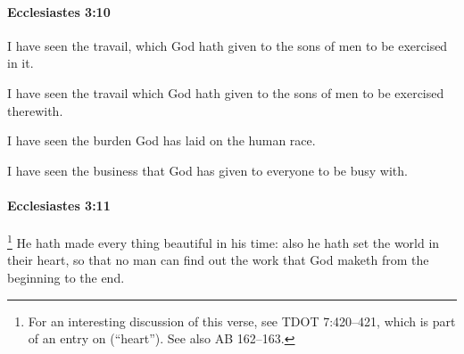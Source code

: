 		\paragraph{Ecclesiastes 3:10} %
			\label{ECCLESIASTES-3-10}

			I have seen the travail, which God hath given to the sons of men to be exercised in it.

			\begin{versebox}
					\item[BHS] 
					\item[LXX] 
					\item[ASV] I have seen the travail which God hath given to the sons of men to be exercised therewith.
					\item[NIV] I have seen the burden God has laid on the human race.
					\item[NRSV] I have seen the business that God has given to everyone to be busy with.
			\end{versebox}

		\paragraph{Ecclesiastes 3:11} %
			\label{ECCLESIASTES-3-11}

				\footnote{%
					\label{ECCLESIASTES-3-11-tdot}%
					For an interesting discussion of this verse, see TDOT 7:420--421, which is part of an entry on  (``heart''). See also AB 162--163.
					}%
			He hath made every thing beautiful in his time: also he hath set the world in their heart, so that no man can find out the work that God maketh from the beginning to the end.

